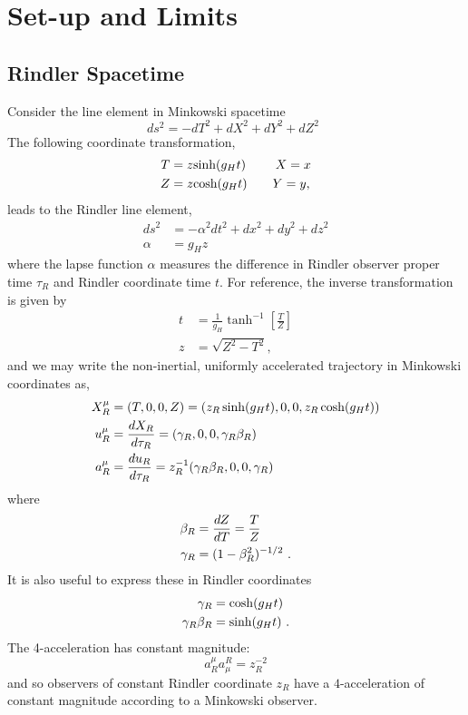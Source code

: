 \section{Set-up and Limits}
\subsection{Rindler Spacetime}
\label{Set-up and Approximations}

Consider the line element in Minkowski spacetime
\begin{equation}
ds^2=-dT^2+dX^2+dY^2+dZ^2 \ \ 
\end{equation}
The following coordinate transformation,
\begin{align}  
T&= z \hbox{sinh}(g_H t)         \hbox{  } \hbox{  }   \hbox{  } \hbox{  }   \hbox{  } \hbox{  } \hbox{  }     X=x     \nonumber \\
Z&= z \hbox{cosh}(g_H t)     \hbox{  } \hbox{  }  \hbox{  } \hbox{  }   \hbox{  }    \hbox{  }   Y=y,
\label{MtoR}
\end{align}
leads to the Rindler line element,
\begin{align}
ds^2 &= -\alpha^2  dt^2 + dx^2 + dy^2 + dz^2 \nonumber \\
\alpha &= g_H z
\label{alphaDef}
\end{align}
where the lapse function $\alpha$ measures the difference in Rindler observer proper time $\tau_R$ and Rindler coordinate time $t$.
For reference, the inverse transformation is given by
\begin{align}  
t&=   \frac{1}{g_H}  \tanh^{-1}\left[ \frac{T}{Z} \right]   \nonumber \\
z&= \sqrt{Z^2 - T^2} ,
\label{RtoM}
\end{align}
and we may write the non-inertial, uniformly accelerated trajectory in Minkowski coordinates as,
\begin{align}
X^\mu_R & =(T,0,0,Z) =(z_R\sinh(g_Ht),0,0,z_R\cosh(g_Ht))\nonumber \\
u_R^\mu & = \frac{dX_R}{d\tau_R}=(\gamma_R,0,0,\gamma_R \beta_R)\nonumber \\
a_R^\mu & = \frac{du_R}{d\tau_R}=z_R^{-1}(\gamma_R\beta_R, 0, 0, \gamma_R)
\label{RindWL}
\end{align}
where
\begin{align}
\beta_R &= \frac{dZ}{dT} =\frac{T}{Z}\nonumber \\
\gamma_R & = (1-\beta_R^2)^{-1/2} \ .
\end{align}
It is also useful to express these in Rindler coordinates
\begin{align}
\gamma_R & =\cosh(g_Ht) \nonumber \\
\gamma_R \beta_R & = \sinh(g_Ht) \ .
\end{align} 
The 4-acceleration has constant magnitude:
\begin{equation}
a_R^\mu a^R_\mu = z_R^{-2}
\end{equation}
and so observers of constant Rindler coordinate $z_R$ have a
$4$-acceleration of constant magnitude according to a Minkowski
observer. 


